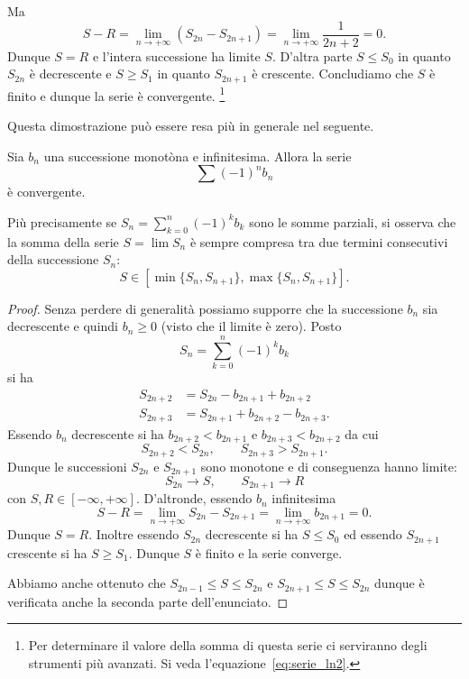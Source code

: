 Ma
\[
  S - R = \lim_{n\to +\infty} (S_{2n} - S_{2n+1}) = \lim_{n\to+\infty}\frac{1}{2n+2} = 0.
\]
Dunque $S=R$ e l'intera successione ha limite $S$. 
D'altra parte $S \le S_0$ in quanto $S_{2n}$ è decrescente e $S\ge S_1$ in quanto $S_{2n+1}$ è crescente. 
Concludiamo che $S$ è finito e dunque la serie è convergente.%
\footnote{%
Per determinare il valore della somma di questa serie ci serviranno degli strumenti più avanzati.
Si veda l'equazione~\ref{eq:serie_ln2}.
}

Questa dimostrazione può essere resa più in generale nel seguente.

\begin{theorem}
\label{th:Leibniz}%
\mymark{***}%
%
%
%
%
Sia $b_n$ una successione monotòna e infinitesima. Allora
la serie
\[
  \sum (-1)^{n} b_n
\]
è convergente.

Più precisamente se $\displaystyle S_n = \sum_{k=0}^n (-1)^k b_k$
sono le somme parziali,
si osserva che la somma della serie $S= \lim S_n$ è sempre compresa
tra due termini consecutivi della successione $S_n$:
\[
  S \in [\min\{S_n, S_{n+1}\}, \max\{S_n, S_{n+1}\}].
\]
\end{theorem}
%
\begin{proof}
\mymark{***}
Senza perdere di generalità possiamo supporre che la successione $b_n$ sia decrescente e quindi $b_n \ge 0$ (visto che il limite è zero).
Posto
\[
 S_n = \sum_{k=0}^n (-1)^k b_k
\]
si ha
\begin{align*}
  S_{2n+2} &= S_{2n} - b_{2n+1} + b_{2n+2} \\
  S_{2n+3} &= S_{2n+1} + b_{2n+2} - b_{2n+3}.
\end{align*}
Essendo $b_n$ decrescente si ha $b_{2n+2} < b_{2n+1}$ e $b_{2n+3} < b_{2n+2}$ da cui
\[
  S_{2n+2} < S_{2n}, \qquad S_{2n+3} > S_{2n+1}.
\]
Dunque le successioni $S_{2n}$ e $S_{2n+1}$ sono monotone e di conseguenza
hanno limite:
\[
  S_{2n} \to S, \qquad S_{2n+1} \to R
\]
con $S, R  \in [-\infty, +\infty]$.
D'altronde, essendo $b_n$ infinitesima
\[
  S - R
  = \lim_{n\to +\infty} S_{2n} - S_{2n+1}
  = \lim_{n\to +\infty} b_{2n+1} = 0.
\]
Dunque $S=R$. Inoltre essendo $S_{2n}$ decrescente si ha
$S \le S_0$ ed essendo $S_{2n+1}$ crescente si ha $S\ge S_1$.
Dunque $S$ è finito e la serie converge.

Abbiamo anche ottenuto che
$S_{2n-1} \le S \le S_{2n}$ e $S_{2n+1} \le S \le S_{2n}$
dunque è verificata anche la seconda parte dell'enunciato.
\end{proof}

